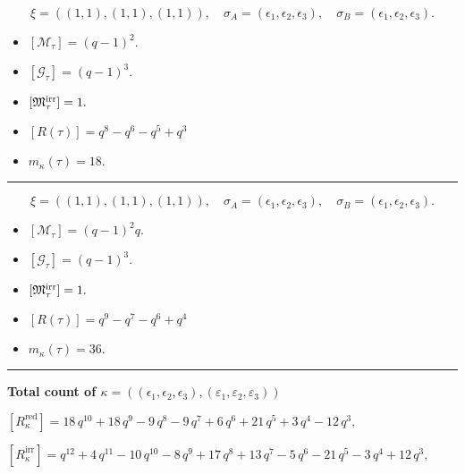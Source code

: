 \documentclass[10pt,a4paper]{amsart}
\begin{document}
$$\xi = ({(1, 1)}, {(1, 1), (1, 1)}),\quad \sigma_A = ({{\epsilon_1}}, {{\epsilon_2}, {\epsilon_3}}),\quad \sigma_B = ({{\epsilon_1}}, {{\epsilon_2}, {\epsilon_3}}).$$

\begin{itemize}
 \item $[\mathcal{M}_{\tau}] = {\left(q - 1\right)}^{2} .$

 \item $[\mathcal{G}_{\tau}] = {\left(q - 1\right)}^{3} .$

 \item $[{\frak M}_{\tau}^{\textrm{irr}}] = 1 .$

 \item $[R(\tau)] = q^{8} - q^{6} - q^{5} + q^{3} $

 \item $m_{\kappa}(\tau) = 18 .$

 \end{itemize}
\noindent\rule{8cm}{0.4pt}

$$\xi = ({(1, 1)}, {(1, 1)}, {(1, 1)}),\quad \sigma_A = ({{\epsilon_1}}, {{\epsilon_2}}, {{\epsilon_3}}),\quad \sigma_B = ({{\epsilon_1}}, {{\epsilon_2}}, {{\epsilon_3}}).$$

\begin{itemize}
 \item $[\mathcal{M}_{\tau}] = {\left(q - 1\right)}^{2} q .$

 \item $[\mathcal{G}_{\tau}] = {\left(q - 1\right)}^{3} .$

 \item $[{\frak M}_{\tau}^{\textrm{irr}}] = 1 .$

 \item $[R(\tau)] = q^{9} - q^{7} - q^{6} + q^{4} $

 \item $m_{\kappa}(\tau) = 36 .$

 \end{itemize}
\noindent\rule{9cm}{2pt}\vspace{0.2cm}

\noindent\textbf{Total count of $\kappa = ((\epsilon_1,\epsilon_2,\epsilon_3), (\varepsilon_1,\varepsilon_2,\varepsilon_3))$}\medskip

${[R_{\kappa}^{\textrm{red}}]} = 18 \, q^{10} + 18 \, q^{9} - 9 \, q^{8} - 9 \, q^{7} + 6 \, q^{6} + 21 \, q^{5} + 3 \, q^{4} - 12 \, q^{3} ,$

${[R_{\kappa}^{\textrm{irr}}]} = q^{12} + 4 \, q^{11} - 10 \, q^{10} - 8 \, q^{9} + 17 \, q^{8} + 13 \, q^{7} - 5 \, q^{6} - 21 \, q^{5} - 3 \, q^{4} + 12 \, q^{3} ,$
\end{document}

